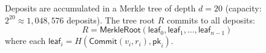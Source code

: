 \begin{definition}
Deposits are accumulated in a Merkle tree of depth $d = 20$ (capacity: $2^{20} \approx 1{,}048{,}576$ deposits). The tree root $R$ commits to all deposits:
\begin{equation}
    R = \mathsf{MerkleRoot}(\mathsf{leaf}_0, \mathsf{leaf}_1, \ldots, \mathsf{leaf}_{n-1})
\end{equation}
where each $\mathsf{leaf}_i = H(\mathsf{Commit}(v_i, r_i), \mathsf{pk}_i)$.
\end{definition}

